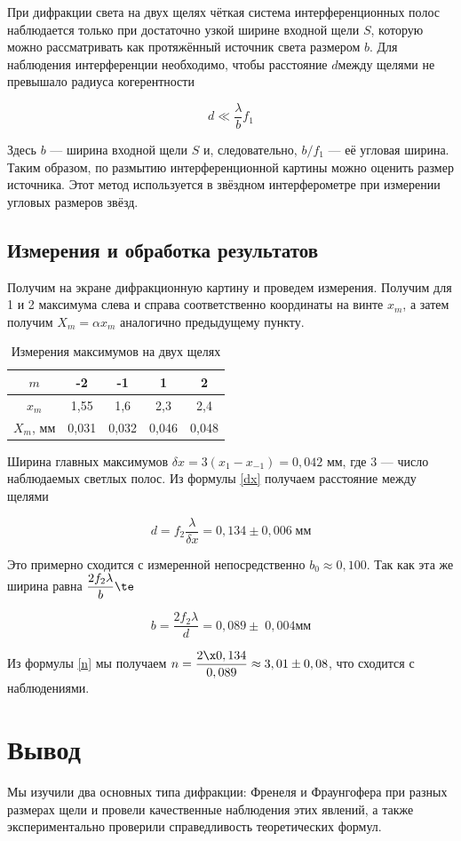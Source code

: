 \documentclass[12pt]{kiarticle}
\begin{document}
При дифракции света на двух щелях чёткая система интерференционных полос наблюдается только при достаточно узкой ширине входной щели $ S $, которую можно рассматривать как протяжённый источник света размером $ b $. Для наблюдения интерференции необходимо, чтобы расстояние $ d $между щелями не превышало радиуса когерентности

\begin{equation}\label{}
d \ll \dfrac{\lambda}{b} f_1
\end{equation}

Здесь $ b $ --- ширина входной щели $ S $ и, следовательно, $  b/f_1 $ --- её угловая ширина. Таким образом, по размытию интерференционной картины можно оценить размер источника. Этот метод используется в звёздном интерферометре при измерении угловых размеров звёзд.

\subsection{Измерения и обработка результатов}

Получим на экране дифракционную картину и проведем измерения. Получим для 1 и 2 максимума слева и справа соответственно координаты на винте $ x_m $, а затем получим $ X_m = \alpha x_m $ аналогично предыдущему пункту. 

\begin{table}[h!]
	\centering
	\caption{Измерения максимумов на двух щелях}
\begin{tabular}{|c|c|c|c|c|}
	\hline 
	$m$ & -2 & -1 & 1 & 2 \\ 
	\hline 
	$x_m$ & 1,55 & 1,6 & 2,3 & 2,4 \\ 
	\hline 
	$X_m$, мм & 0,031 & 0,032 & 0,046 & 0,048 \\ 
	\hline 
\end{tabular}   
\end{table}

 Ширина главных максимумов $  \delta x  = 3 (x_{1} - x_{-1} )= 0,042 $ мм, где 3 --- число наблюдаемых светлых полос. Из формулы \eqref{dx} получаем расстояние между щелями 
 
 \begin{equation}\label{}
 d = f_2 \dfrac{\lambda}{\delta x} = 0,134 \pm 0,006 \; мм
 \end{equation}
 
Это примерно сходится с измеренной непосредственно $ b_0 \approx 0,100 $. Так как эта же ширина равна $ \dfrac{2f_2 \lambda}{b} \te $
 
 \begin{equation}\label{}
 b = \dfrac{2 f_2 \lambda}{d} = 0,089 \pm \;0,004 мм
 \end{equation}
 
 Из формулы \eqref{n} мы получаем $ n = \dfrac{2 \x 0,134}{0,089} \approx 3,01 \pm 0,08 $, что сходится с наблюдениями. 
 
 \section{Вывод}
 
 Мы изучили два основных типа дифракции: Френеля и Фраунгофера при разных размерах щели и провели качественные наблюдения этих явлений, а также экспериментально проверили справедливость теоретических формул.  
\end{document}
